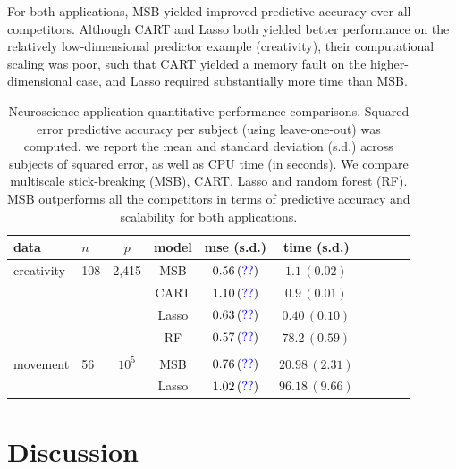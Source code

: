 \documentclass{article} %
\newcommand{\dd}[1]{{\color{blue}{\it #1}}}
\begin{document}
For both applications, MSB yielded improved predictive accuracy over all competitors.  Although CART and Lasso both yielded better performance on the relatively low-dimensional predictor example (creativity), their computational scaling was poor, such that CART yielded a memory fault on the higher-dimensional case, and Lasso required substantially more time than MSB.  







\begin{table}[t]
\caption{Neuroscience application quantitative performance comparisons. Squared error predictive accuracy per subject (using leave-one-out) was computed. we report the mean and standard deviation (s.d.) across subjects of squared error, as well as CPU time (in seconds).
We compare multiscale stick-breaking (MSB), CART, Lasso and random forest (RF). MSB outperforms all the competitors in terms of predictive accuracy and scalability for both applications.}\label{real}
\vskip 0.15in
\begin{center}
\begin{small}
\begin{sc}
\begin{tabular}{llcccccccc}
\hline
data &$n$&$p$ &model&mse (s.d.) & time (s.d.) \\ %
\hline
creativity & 108 & 2,415 & MSB &$0.56 \, (\dd{??})$ &  $1.1 \, (0.02)$\\
 &&& CART & $1.10 \, (\dd{??}) $ &  $0.9 \, (0.01)$\\
&&& Lasso & $0.63 \, (\dd{??})$  &  $0.40 \, (0.10)$\\
&&& RF & $0.57 \, (\dd{??})$ &   $78.2 \, (0.59)$\\
\\
 movement & 56 & $10^5$& MSB &$0.76 \, (\dd{??})$  & $20.98 \, (2.31)$\\
 &&& Lasso & $1.02 \, (\dd{??})$ & $96.18 \, (9.66)$\\
\hline
\end{tabular}
\end{sc}
\end{small}
\end{center}
\vspace{-10pt}
\end{table}

\section{Discussion} \label{sec:disc}
\end{document}
